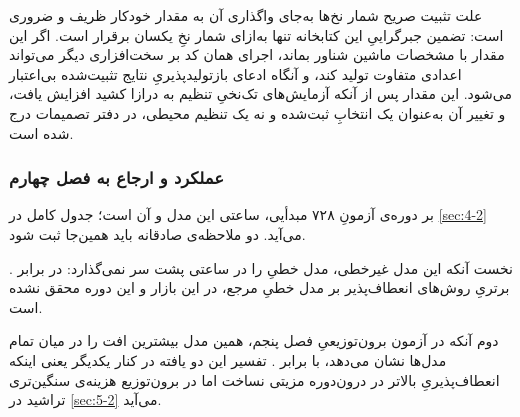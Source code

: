 علت تثبیت صریح شمار نخ‌ها  به‌جای واگذاری آن به مقدار خودکار  ظریف و
ضروری است: تضمین جبرگراییِ این کتابخانه تنها به‌ازای شمار نخِ یکسان برقرار است. اگر
این مقدار با مشخصات ماشین شناور بماند، اجرای همان کد بر سخت‌افزاری دیگر می‌تواند
اعدادی متفاوت تولید کند، و آنگاه ادعای بازتولیدپذیریِ نتایج تثبیت‌شده بی‌اعتبار
می‌شود. این مقدار پس از آنکه آزمایش‌های تک‌نخیِ تنظیم به درازا کشید افزایش یافت، و
تغییر آن به‌عنوان یک انتخابِ ثبت‌شده و نه یک تنظیم محیطی، در دفتر تصمیمات درج شده
است.

\subsubsection*{عملکرد و ارجاع به فصل چهارم}

بر دوره‌ی آزمونِ ۷۲۸ مبدأیی،  ساعتی این مدل  و  آن
 است؛ جدول کامل در \cref{sec:4-2} می‌آید. دو ملاحظه‌ی صادقانه باید همین‌جا ثبت شود.

نخست آنکه این مدل غیرخطی، مدل خطیِ  را در  ساعتی پشت سر
نمی‌گذارد:  در برابر . برتریِ روش‌های انعطاف‌پذیر بر مدل خطیِ
مرجع، در این بازار و این دوره محقق نشده است.

دوم آنکه در آزمون برون‌توزیعیِ فصل پنجم، همین مدل بیشترین افت را در میان تمام مدل‌ها
نشان می‌دهد، با  برابر . تفسیر این دو یافته در کنار یکدیگر
 یعنی اینکه انعطاف‌پذیریِ بالاتر در درون‌دوره مزیتی نساخت اما در برون‌توزیع
هزینه‌ی سنگین‌تری تراشید  در \cref{sec:5-2} می‌آید.
